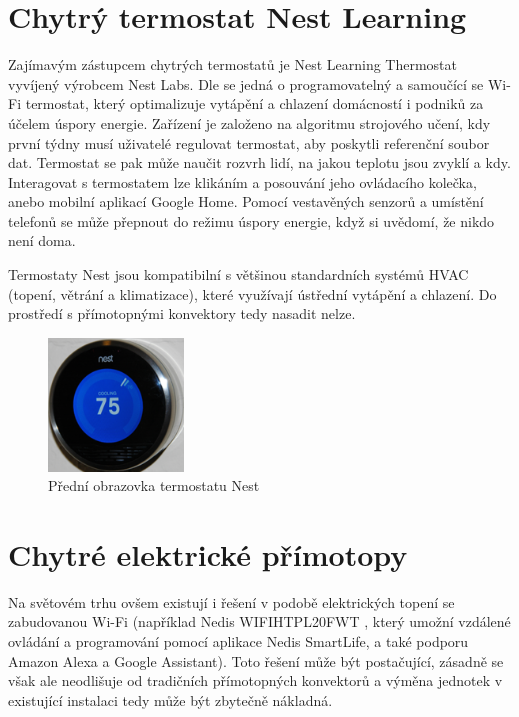 \section{Chytrý termostat Nest Learning}
Zajímavým zástupcem chytrých termostatů je Nest Learning Thermostat vyvíjený výrobcem Nest Labs. Dle \cite{nest} se jedná o programovatelný a samoučící se Wi-Fi termostat, který optimalizuje vytápění a chlazení domácností i podniků za účelem úspory energie. Zařízení je založeno na algoritmu strojového učení, kdy první týdny musí uživatelé regulovat termostat, aby poskytli referenční soubor dat. Termostat se pak může naučit rozvrh lidí, na jakou teplotu jsou zvyklí a kdy. Interagovat s termostatem lze klikáním a posouvání jeho ovládacího kolečka, anebo mobilní aplikací Google Home. Pomocí vestavěných senzorů a umístění telefonů se může přepnout do režimu úspory energie, když si uvědomí, že nikdo není doma.

Termostaty Nest jsou kompatibilní s většinou standardních systémů HVAC (topení, větrání a klimatizace), které využívají ústřední vytápění a chlazení. Do prostředí s přímotopnými konvektory tedy nasadit nelze.

\begin{figure}[hbt]
\centering
\includegraphics[width=0.32\textwidth]{obrazky-figures/nest.png}
\caption{Přední obrazovka termostatu Nest}
\end{figure}

\pagebreak

\section{Chytré elektrické přímotopy}
Na světovém trhu ovšem existují i řešení v podobě elektrických topení se zabudovanou Wi-Fi (například Nedis WIFIHTPL20FWT \cite{nedis}, který umožní vzdálené ovládání a programování pomocí aplikace Nedis SmartLife, a také podporu Amazon Alexa a Google Assistant). Toto řešení může být postačující, zásadně se však ale neodlišuje od tradičních přímotopných konvektorů a výměna jednotek v existující instalaci tedy může být zbytečně nákladná.


